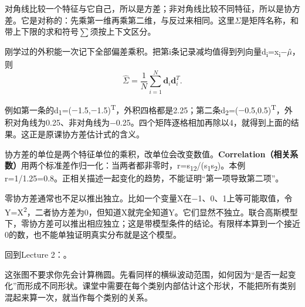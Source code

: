 对角线比较一个特征与它自己，所以是方差；非对角线比较不同特征，所以是协方差。它是对称的：先乘第一维再乘第二维，与反过来相同。这里\ensuremath{\Sigma}是矩阵名称，和带上下限的求和符号\ensuremath{\sum}须按上下文区分。


刚学过的外积能一次记下全部偏差乘积。把第i条记录减均值得到列向量d\textsubscript{i}=x\textsubscript{i}\ensuremath{-}\ensuremath{\mu}̂，则
\[
\hat\Sigma=\frac1N\sum_{i=1}^N\mathbf{d}_i\mathbf{d}_i^T.\tag{M.30}
\]


例如第一条的d\textsubscript{1}=(\ensuremath{-}1.5,\ensuremath{-}1.5)\textsuperscript{T}，外积四格都是2.25；第二条d\textsubscript{2}=(\ensuremath{-}0.5,0.5)\textsuperscript{T}，外积对角线为0.25、非对角线为\ensuremath{-}0.25。四个矩阵逐格相加再除以4，就得到上面的结果。这正是原课协方差估计式的含义。


协方差的单位是两个特征单位的乘积，改单位会改变数值。\textbf{Correlation（相关系数）}用两个标准差作归一化：当两者都非零时，r=s\textsubscript{1}\textsubscript{2}/(s\textsubscript{1}s\textsubscript{2})。本例r=1/1.25=0.8。正相关描述一起变化的趋势，不能证明“第一项导致第二项”。


零协方差通常也不足以推出独立。比如一个变量X在\ensuremath{-}1、0、1上等可能取值，令Y=X\textsuperscript{2}，二者协方差为0，但知道X就完全知道Y。它们显然不独立。联合高斯模型下，零协方差可以推出相应独立；这是带模型条件的结论。有限样本算到一个接近0的数，也不能单独证明真实分布就是这个模型。


回到Lecture 2：。









这张图不要求你先会计算椭圆。先看同样的横纵波动范围，如何因为“是否一起变化”而形成不同形状。课堂中需要在每个类别内部估计这个形状，不能把所有类别混起来算一次，就当作每个类别的关系。








